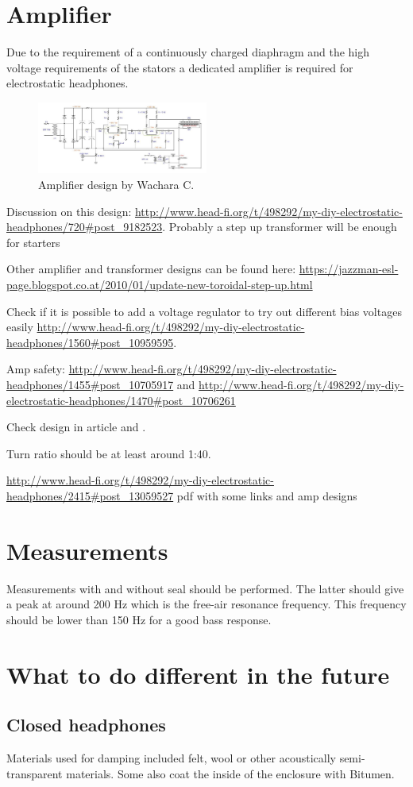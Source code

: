 \documentclass{article}
\begin{document}
\section{Amplifier}
\label{s:amp}
Due to the requirement of a continuously charged diaphragm and the high voltage requirements of the stators a dedicated amplifier is required for electrostatic headphones.
\begin{figure}[htb]
    \centering
    \includegraphics[width=0.5\textwidth]{images/wachara-amp.png}
    \caption{Amplifier design by Wachara C.}
    \label{f:amp:wachara}
\end{figure}
Discussion on this design: \url{http://www.head-fi.org/t/498292/my-diy-electrostatic-headphones/720#post_9182523}. Probably a step up transformer will be enough for starters

Other amplifier and transformer designs can be found here: \url{https://jazzman-esl-page.blogspot.co.at/2010/01/update-new-toroidal-step-up.html}

Check if it is possible to add a voltage regulator to try out different bias voltages easily \url{http://www.head-fi.org/t/498292/my-diy-electrostatic-headphones/1560#post_10959595}.

Amp safety: \url{http://www.head-fi.org/t/498292/my-diy-electrostatic-headphones/1455#post_10705917} and \url{http://www.head-fi.org/t/498292/my-diy-electrostatic-headphones/1470#post_10706261}

Check design in article \cite{ww_1979} and \cite{verwaal_2011}.

Turn ratio should be at least around 1:40.

\url{http://www.head-fi.org/t/498292/my-diy-electrostatic-headphones/2415#post_13059527} pdf with some links and amp designs

\section{Measurements}
\label{s:measurements}

Measurements with and without seal should be performed. The latter should give a peak at around 200 Hz which is the free-air resonance frequency. This frequency should be lower than 150 Hz for a good bass response.

\section{What to do different in the future}
\label{s:future}

\subsection{Closed headphones}
\label{s:future:closed}
Materials used for damping included felt, wool or other acoustically semi-transparent materials. Some also coat the inside of the enclosure with Bitumen.




\end{document}
